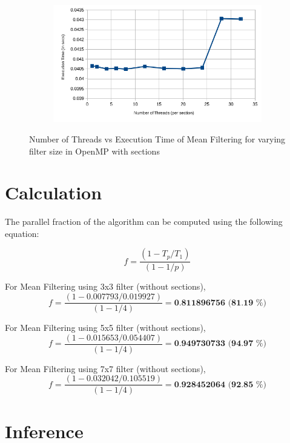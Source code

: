 \documentclass{article}
\begin{document}
\begin{figure}[!htbp]
	\begin{subfigure}[!htbp]{\textwidth}
		\centering
		\includegraphics[scale=0.8]{with-sections-7x7-performance}
	\end{subfigure}
	
	\caption{Number of Threads vs Execution Time of Mean Filtering for varying filter size in OpenMP with sections}
\end{figure}

\section{Calculation}

The parallel fraction of the algorithm can be computed using the following equation:

\begin{equation}
	f = \frac{(1-T_p/T_1)}{(1-1/p)}
\end{equation}

For Mean Filtering using 3x3 filter (without sections),
	\[f = \frac{(1-0.007793/0.019927)}{(1-1/4)} = \textbf{0.811896756 (81.19 \%)}\]
	
For Mean Filtering using 5x5 filter (without sections),
	\[f = \frac{(1-0.015653/0.054407)}{(1-1/4)} = \textbf{0.949730733 (94.97 \%)}\]

For Mean Filtering using 7x7 filter (without sections),
	\[f = \frac{(1-0.032042/0.105519)}{(1-1/4)} = \textbf{0.928452064 (92.85 \%)}\]	

\section{Inference}
\end{document}
